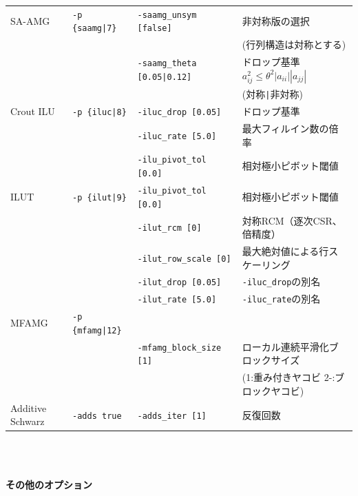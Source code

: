 \documentclass[a4paper]{jarticle}
\begin{document}
{{\begin{minipage}[t]{\textwidth}
\begin{center}
\begin{tabular}{l|lll}
SA-AMG   & \verb=-p {saamg|7}=   & \verb=-saamg_unsym [false]=     & 非対称版の選択 \\
         &                       &                                 & (行列構造は対称とする) \\
         &                       & \verb=-saamg_theta [0.05|0.12]= & ドロップ基準 $a^2_{ij}\le\theta^2|a_{ii}||a_{jj}|$ \\
         &                       &                             & (対称\verb=|=非対称) \\
Crout ILU& \verb=-p {iluc|8}=    & \verb=-iluc_drop [0.05]=    & ドロップ基準    \\
         &                       & \verb=-iluc_rate [5.0]=     & 最大フィルイン数の倍率 \\
         &                       & \verb=-ilu_pivot_tol [0.0]= & 相対極小ピボット閾値 \\
ILUT     & \verb=-p {ilut|9}=    & \verb=-ilu_pivot_tol [0.0]= & 相対極小ピボット閾値 \\
         &                       & \verb=-ilut_rcm [0]= & 対称RCM（逐次CSR、倍精度） \\
         &                       & \verb=-ilut_row_scale [0]= & 最大絶対値による行スケーリング \\
         &                       & \verb=-ilut_drop [0.05]= & \verb=-iluc_drop=の別名 \\
         &                       & \verb=-ilut_rate [5.0]= & \verb=-iluc_rate=の別名 \\
MFAMG   & \verb=-p {mfamg|12}=  &                             &                            \\
         &                       & \verb=-mfamg_block_size [1]= & ローカル連続平滑化ブロックサイズ \\
         &                       &                              & (1:重み付きヤコビ 2-:ブロックヤコビ) \\
Additive Schwarz  & \verb=-adds true=   &  \verb=-adds_iter [1]= & 反復回数   \\
\hline         
\end{tabular}
\end{center}
\end{minipage}
\\ \\
\begin{minipage}[t]{\textwidth}
\begin{center}
{\bf その他のオプション}\\
\begin{tabular}{l|ll}\hline\hline

\end{tabular}
\end{center}
\end{minipage}}}
\end{document}
